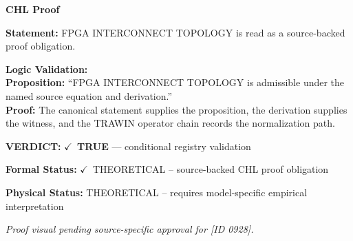 \vspace{0.45em}
\noindent\textbf{CHL Proof}\par
\textbf{Statement:} FPGA INTERCONNECT TOPOLOGY is read as a source-backed proof obligation.

\textbf{Logic Validation:}\\
\textbf{Proposition:} ``FPGA INTERCONNECT TOPOLOGY is admissible under the named source equation and derivation.''\\
\textbf{Proof:} The canonical statement supplies the proposition, the derivation supplies the witness, and the TRAWIN operator chain records the normalization path.

\textbf{VERDICT:} \ensuremath{\checkmark}\ \textbf{TRUE} --- conditional registry validation

\textbf{Formal Status:} \ensuremath{\checkmark}\ THEORETICAL -- source-backed CHL proof obligation

\textbf{Physical Status:} THEORETICAL -- requires model-specific empirical interpretation
\par\vspace{0.45em}
\par
\vfill
\begingroup\footnotesize\itshape
Proof visual pending source-specific approval for [ID 0928].
\par\endgroup
\vfill
\endgroup
\endgroup
